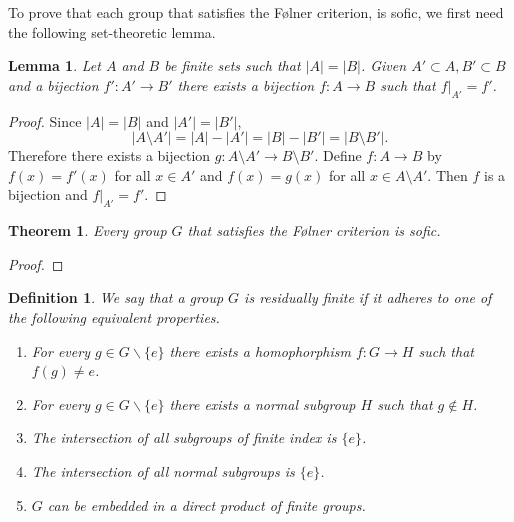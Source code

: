 \documentclass[a4paper]{report}
\newcommand{\card}[1]{\left| #1 \right|}
\newtheorem{theorem}{Theorem}
\newtheorem{definition}{Definition}
\newtheorem{lemma}{Lemma}
\begin{document}
To prove that each group that satisfies the Følner criterion, is sofic, we first need the following set-theoretic lemma.

    \begin{lemma}\label{lem:finite_bijections} 
        Let $A$ and $B$ be finite sets such that $|A| = |B|$. Given $A' \subset A, B' \subset B$ and a bijection $f': A' \to B'$ there exists a bijection $f: A \to B$ such that $f|_{A'} = f'$. 
    \end{lemma}
    \begin{proof}
        Since $\card A = \card B$ and $\card{A'} = \card{B'}$,
        \[
        \card{A \setminus A'} = \card A - \card{A'} = \card B - \card{B'} = \card{B \setminus B'}.
        \]
        Therefore there exists a bijection $g: A \setminus A' \to B \setminus B'$. Define $f: A  \to B$ by $f(x) = f'(x)$ for all $x \in A'$ and $f(x)=g(x)$ for all $x \in A \setminus A'$. Then $f$ is a bijection and $f|_{A'} = f'$.
    \end{proof}

 	\begin{theorem}
        Every group $G$ that satisfies the Følner criterion is sofic.
    \end{theorem}
    \begin{proof}
        
 	\end{proof}

\begin{definition}\cite{noauthor_residually_2018} \label{def:res_fin}
       We say that a group $G$ is residually finite if it adheres to one of the following equivalent properties.
        \begin{enumerate}
            \item For every $g \in G\backslash\{e\}$ there exists a homophorphism $f:G \to H$ such that $f(g) \ne e$.
            \item For every $g \in G\backslash\{e\}$ there exists a normal subgroup $H$ such that $g \notin H$.
            \item The intersection of all subgroups of finite index is $\{e\}$.
            \item The intersection of all normal subgroups is $\{e\}$.
            \item $G$ can be embedded in a direct product of finite groups.
        \end{enumerate}
    \end{definition}

\end{document}
